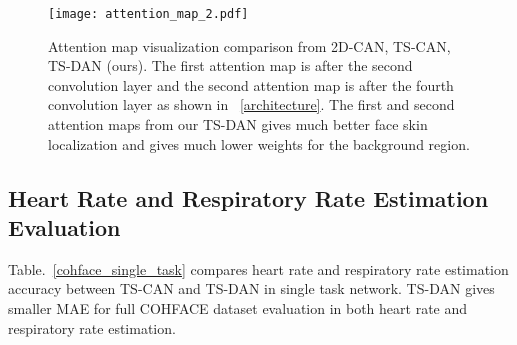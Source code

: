 \documentclass[conference]{IEEEtran}
\begin{document}
\begin{figure}[ht]
\texttt{[image: attention\_map\_2.pdf]}
\caption{Attention map visualization comparison from 2D-CAN\cite{chen2018deepphys}, TS-CAN\cite{liu2020multi}, TS-DAN (ours). The first attention map is after the second convolution layer and the second attention map is after the fourth convolution layer as shown in \figurename~\ref{architecture}. The first and second attention maps from our TS-DAN gives much better face skin localization and gives much lower weights for the background region.}
\label{attention_map}
\end{figure}

\subsection{Heart Rate and Respiratory Rate Estimation Evaluation}
Table.~\ref{cohface_single_task} compares heart rate and respiratory rate estimation accuracy between TS-CAN and TS-DAN in single task network. TS-DAN gives smaller MAE for full COHFACE dataset evaluation in both heart rate and respiratory rate estimation.

\end{document}
